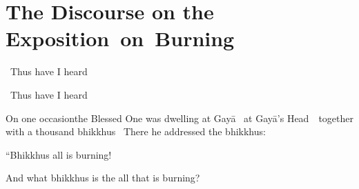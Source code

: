 
\section{The Discourse on the \mbox{Exposition}~on~Burning}
\label{exposition-on-burning}

\ifninebythirteen

\vspace{0.1cm}

\begin{leader-english}
  \anglebracketleft\ \hspace{-0.5mm}Thus have I heard \hspace{-0.5mm}\anglebracketright\
\end{leader-english}

\vspace{-0.2cm}

\else

\begin{leader-english}
  \anglebracketleft\ \hspace{-0.5mm}Thus have I heard \hspace{-0.5mm}\anglebracketright\
\end{leader-english}

\fi

\begin{english-only-hang}
  On one occasion\makeatletter\hyperlink{endnote113-appendix}\makeatother\thinspace the Blessed One was dwelling at Gayā \breathmark\ at Gayā's \mbox{Head}~\breathmark\ together with a thousand bhikkhus \breathmark\ There he addressed the bhikkhus:
\end{english-only-hang}

\begin{english-only-hang}
  ``Bhikkhus all is burning!
\end{english-only-hang}

\begin{english-only-hang}
  And what bhikkhus is the all that is burning?
\end{english-only-hang}

